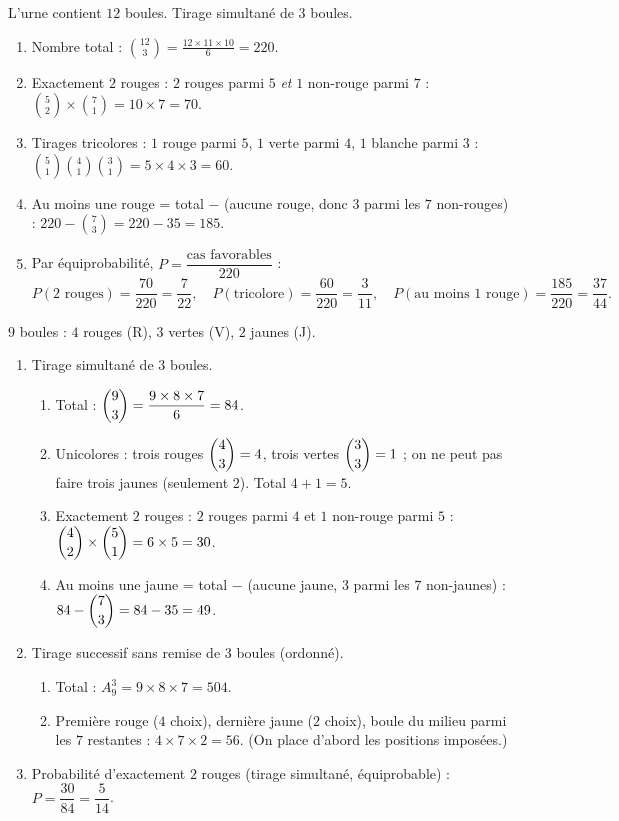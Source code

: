 L'urne contient $12$ boules. Tirage simultané de $3$ boules.
\begin{enumerate}[label=\arabic*)]
\item Nombre total : $\displaystyle\binom{12}{3}=\frac{12\times 11\times 10}{6}=220$.
\item Exactement $2$ rouges : $2$ rouges parmi $5$ \emph{et} $1$ non-rouge parmi $7$ :
$\binom52\times\binom71=10\times 7=70$.
\item Tirages tricolores : $1$ rouge parmi $5$, $1$ verte parmi $4$, $1$ blanche parmi $3$ :
$\binom51\binom41\binom31=5\times 4\times 3=60$.
\item Au moins une rouge = total $-$ (aucune rouge, donc $3$ parmi les $7$ non-rouges) :
$220-\binom73=220-35=185$.
\item Par équiprobabilité, $P=\dfrac{\text{cas favorables}}{220}$ :
\[
P(\text{2 rouges})=\frac{70}{220}=\frac{7}{22},\quad
P(\text{tricolore})=\frac{60}{220}=\frac{3}{11},\quad
P(\text{au moins 1 rouge})=\frac{185}{220}=\frac{37}{44}.
\]
\end{enumerate}

$9$ boules : $4$ rouges (R), $3$ vertes (V), $2$ jaunes (J).
\begin{enumerate}[label=\arabic*)]
\item Tirage simultané de $3$ boules.
\begin{enumerate}[label=\alph*)]
\item Total : $\dbinom93=\dfrac{9\times8\times7}{6}=84$.
\item Unicolores : trois rouges $\dbinom43=4$, trois vertes $\dbinom33=1$ ; on ne peut pas
faire trois jaunes (seulement $2$). Total $4+1=5$.
\item Exactement $2$ rouges : $2$ rouges parmi $4$ et $1$ non-rouge parmi $5$ :
$\dbinom42\times\dbinom51=6\times5=30$.
\item Au moins une jaune = total $-$ (aucune jaune, $3$ parmi les $7$ non-jaunes) :
$84-\dbinom73=84-35=49$.
\end{enumerate}
\item Tirage successif sans remise de $3$ boules (ordonné).
\begin{enumerate}[label=\alph*)]
\item Total : $A_9^{3}=9\times8\times7=504$.
\item Première rouge ($4$ choix), dernière jaune ($2$ choix), boule du milieu parmi les
$7$ restantes : $4\times 7\times 2=56$. (On place d'abord les positions imposées.)
\end{enumerate}
\item Probabilité d'exactement $2$ rouges (tirage simultané, équiprobable) :
$P=\dfrac{30}{84}=\dfrac{5}{14}$.
\end{enumerate}

